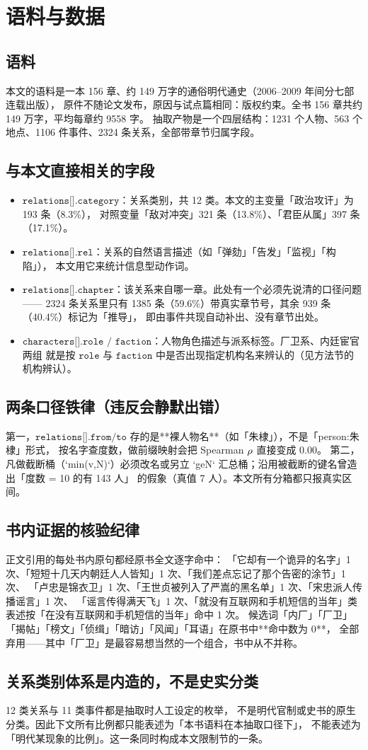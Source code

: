 \section{语料与数据}

\subsection{语料}本文的语料是一本 156 章、约 149 万字的通俗明代通史（2006--2009 年间分七部连载出版），
原件不随论文发布，原因与试点篇相同：版权约束。全书 156 章共约 149 万字，平均每章约 9558 字。
抽取产物是一个四层结构：1231 个人物、563 个地点、1106 件事件、2324 条关系，全部带章节归属字段。

\subsection{与本文直接相关的字段}
\begin{itemize}
  \item $\texttt{relations[].category}$：关系类别，共 12 类。本文的主变量「政治攻讦」为 193 条（8.3\%），
        对照变量「敌对冲突」321 条（13.8\%）、「君臣从属」397 条（17.1\%）。
  \item $\texttt{relations[].rel}$：关系的自然语言描述（如「弹劾」「告发」「监视」「构陷」），
        本文用它来统计信息型动作词。
  \item $\texttt{relations[].chapter}$：该关系来自哪一章。此处有一个必须先说清的口径问题——
        2324 条关系里只有 1385 条（59.6\%）带真实章节号，其余 939 条（40.4\%）标记为「推导」，
        即由事件共现自动补出、没有章节出处。
  \item $\texttt{characters[].role / faction}$：人物角色描述与派系标签。厂卫系、内廷宦官两组
        就是按 $\texttt{role}$ 与 $\texttt{faction}$ 中是否出现指定机构名来辨认的（见方法节的机构辨认）。
\end{itemize}

\subsection{两条口径铁律（违反会静默出错）}
第一，$\texttt{relations[].from/to}$ 存的是**裸人物名**（如「朱棣」），不是「person:朱棣」形式，
按名字查度数，做前缀映射会把 Spearman $\rho$ 直接变成 0.00。
第二，凡做截断桶（`min(v,N)`）必须改名或另立 `geN` 汇总桶；沿用被截断的键名曾造出「度数 = 10 的有 143 人」
的假象（真值 7 人）。本文所有分箱都只报真实区间。

\subsection{书内证据的核验纪律}正文引用的每处书内原句都经原书全文逐字命中：
「它却有一个诡异的名字」1 次、「短短十几天内朝廷人人皆知」1 次、「我们差点忘记了那个告密的涂节」1 次、
「卢忠是锦衣卫」1 次、「王世贞被列入了严嵩的黑名单」1 次、「宋忠派人传播谣言」1 次、
「谣言传得满天飞」1 次、「就没有互联网和手机短信的当年」类表述按「在没有互联网和手机短信的当年」命中 1 次。
候选词「内厂」「厂卫」「揭帖」「榜文」「侦缉」「暗访」「风闻」「耳语」在原书中**命中数为 0**，
全部弃用——其中「厂卫」是最容易想当然的一个组合，书中从不并称。

\subsection{关系类别体系是内造的，不是史实分类}12 类关系与 11 类事件都是抽取时人工设定的枚举，
不是明代官制或史书的原生分类。因此下文所有比例都只能表述为「本书语料在本抽取口径下」，
不能表述为「明代某现象的比例」。这一条同时构成本文限制节的一条。
